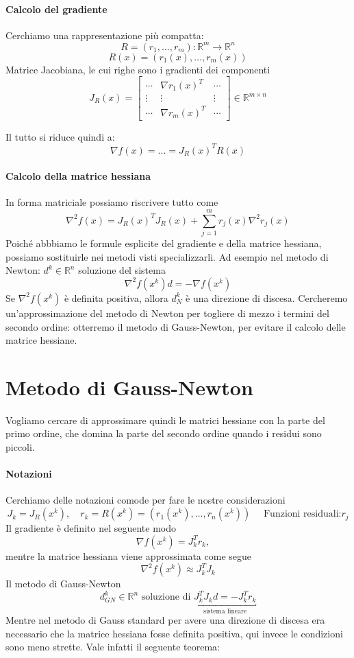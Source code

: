 \documentclass[a4paper,10pt]{article}
\begin{document}
\paragraph{Calcolo del gradiente}
Cerchiamo una rappresentazione pi\`u compatta:
$$ R = (r_1, \ldots, r_m): \mathbb{R}^m \rightarrow \mathbb{R}^{n}$$
$$R(x) = (r_1(x), \ldots, r_m(x)) $$
Matrice Jacobiana, le cui righe sono i gradienti dei componenti
$$J_R(x) =
\left[
\begin{array}{ccc}
 \cdots & \nabla r_1(x)^{T} & \cdots \\
\vdots & \vdots & \vdots  \\
 \cdots & \nabla r_m(x)^{T} & \cdots 
\end{array}
\right]
\in \mathbb{R}^{m \times n}
 $$

Il tutto si riduce quindi a:
$$ \nabla f(x) = \ldots = J_R(x)^{T}R(x)$$

\paragraph{Calcolo della matrice hessiana}
In forma matriciale possiamo riscrivere tutto come
$$ \nabla^{2}f(x) = J_R(x)^{T}J_R(x) + 
 \displaystyle \sum_{j=1}^{m} r_j(x) \nabla^{2} r_j(x)$$
Poich\'e abbbiamo le formule esplicite del gradiente e della matrice
hessiana, possiamo sostituirle nei metodi visti
specializzarli.  Ad esempio nel metodo di Newton: $d^{k} \in
\mathbb{R}^{n}$ soluzione del sistema
$$ \nabla^{2}f(x^{k})d = - \nabla f(x^{k}) $$
Se $\nabla^{2} f(x^{k})$ è definita positiva, allora $d_{N}^{k}$ è una
direzione di discesa.  Cercheremo un'approssimazione del metodo di
Newton per togliere di mezzo i termini del secondo ordine: otterremo
il metodo di Gauss-Newton, per evitare il calcolo delle matrice
hessiane.

\section{Metodo di Gauss-Newton}
Vogliamo cercare di approssimare quindi le matrici hessiane con 
la parte del primo ordine, che domina la parte del secondo
ordine quando i residui sono piccoli.

\paragraph{Notazioni}
Cerchiamo delle notazioni comode per fare le nostre
considerazioni
$$ J_k = J_{R}(x^{k}), \quad r_k = R(x^k)= (r_1(x^{k}), \ldots,
r_n(x^{k}))
\quad
\text{ Funzioni residuali:$r_j$
}
$$
Il gradiente \`e definito nel seguente modo
$$ \nabla f(x^{k}) = J_{k}^{T}r_k,\quad$$
mentre la matrice hessiana viene approssimata
come segue
$$\nabla^{2}f(x^{k}) \approx J_k^{T}J_k $$
Il metodo di Gauss-Newton 
$$ d^{k}_{GN} \in \mathbb{R}^{n} 
\text{ soluzione di } \underbracket{J_{k}^{T}J_kd = - J_k^{T}r_k}_{\text{sistema lineare}}$$
Mentre nel metodo di Gauss standard per avere una direzione di discesa
era necessario che la matrice hessiana fosse definita positiva,
qui invece le condizioni sono meno strette.
Vale infatti il seguente teorema:
\end{document}
